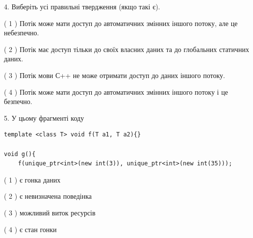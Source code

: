 \documentclass[12pt, ukrainian]{article}
\begin{document}
\begin {large}
{%
4. Виберіть усі правильні твердження (якщо такі є).\par
\vspace{2mm}

( 1 ) Потік може мати доступ до автоматичних змінних іншого потоку, але це небезпечно.%

( 2 ) Потік має доступ тільки до своїх власних даних та до глобальних статичних даних.%

( 3 ) Потік мови С++ не може отримати доступ до даних іншого потоку.%

( 4 ) Потік може мати доступ до автоматичних змінних іншого потоку і це безпечно.%


5. У цьому фрагменті коду
\begin{verbatim}
template <class T> void f(T a1, T a2){}

void g(){
    f(unique_ptr<int>(new int(3)), unique_ptr<int>(new int(35)));
\end{verbatim}

( 1 ) є гонка даних%

( 2 ) є невизначена поведінка%

( 3 ) можливий виток ресурсів%

( 4 ) є стан гонки%
}
\end {large}
\end{document}
